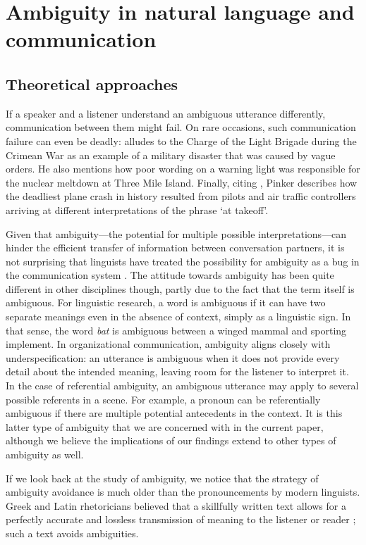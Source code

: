 \documentclass[10pt,a4paper]{article}
\begin{document}
\section{Ambiguity in natural language and communication}
\subsection{Theoretical approaches}

If a speaker and a listener understand an ambiguous utterance differently, communication between them might fail.
On rare occasions, such communication failure can even be deadly: 
 alludes to the Charge of the Light Brigade during the Crimean War as an example of a military disaster that was caused by vague orders.
He also mentions how poor wording on a warning light was responsible for the nuclear meltdown at Three Mile Island. Finally, citing , Pinker describes how the deadliest plane crash in history resulted from pilots and air traffic controllers arriving at different interpretations of the phrase `at takeoff'.

Given that ambiguity---the potential for multiple possible interpretations---can hinder the efficient transfer of information between conversation partners, it is not surprising that linguists have treated the possibility for ambiguity as a bug in the communication system \cite{grice1975,chomsky2002minimalism}. The attitude towards ambiguity has been quite different in other disciplines though, partly due to the fact that the term itself is ambiguous. For linguistic research, a word is ambiguous if it can have two separate meanings even in the absence of context, simply as a linguistic sign. In that sense, the word \textit{bat} is ambiguous between a winged mammal and sporting implement. In organizational communication, ambiguity aligns closely with underspecification: an utterance is ambiguous when it does not provide every detail about the intended meaning, leaving room for the listener to interpret it. In the case of referential ambiguity, an ambiguous utterance may apply to several possible referents in a scene. For example, a pronoun can be referentially ambiguous if there are multiple potential antecedents in the context. It is this latter type of ambiguity that we are concerned with in the current paper, although we believe the implications of our findings extend to other types of ambiguity as well.

If we look back at the study of ambiguity, we notice that the strategy of ambiguity avoidance is much older than the pronouncements by modern linguists. Greek and Latin rhetoricians believed that a skillfully written text allows for a perfectly accurate and lossless transmission of meaning to the listener or reader \cite{ossarichardson2019}; such a text avoids ambiguities.
\end{document}
